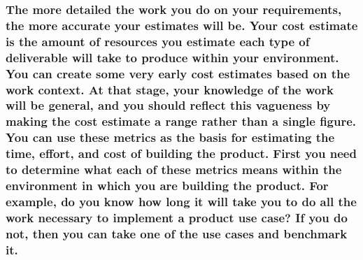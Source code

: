 \documentclass[
]{article}
\begin{document}
{\subsubsection{\texorpdfstring{The more detailed the work you do on your
requirements, the more accurate your estimates will be. Your cost
estimate is the amount of resources you estimate each type of
deliverable will take to produce within your environment. You can create
some very early cost estimates based on the work context. At that stage,
your knowledge of the work will be general, and you should reflect this
vagueness by making the cost estimate a range rather than a single
figure. You can use these metrics as the basis for estimating the time,
effort, and cost of building the product. First you need to determine
what each of these metrics means within the environment in which you are
building the product. For example, do you know how long it will take you
to do all the work necessary to implement a product use case? If you do
not, then you can take one of the use cases and benchmark it.
}{The more detailed the work you do on your requirements, the more accurate your estimates will be. Your cost estimate is the amount of resources you estimate each type of deliverable will take to produce within your environment. You can create some very early cost estimates based on the work context. At that stage, your knowledge of the work will be general, and you should reflect this vagueness by making the cost estimate a range rather than a single figure. You can use these metrics as the basis for estimating the time, effort, and cost of building the product. First you need to determine what each of these metrics means within the environment in which you are building the product. For example, do you know how long it will take you to do all the work necessary to implement a product use case? If you do not, then you can take one of the use cases and benchmark it. }}\label{the-more-detailed-the-work-you-do-on-your-requirements-the-more-accurate-your-estimates-will-be.-your-cost-estimate-is-the-amount-of-resources-you-estimate-each-type-of-deliverable-will-take-to-produce-within-your-environment.-you-can-create-some-very-early-cost-estimates-based-on-the-work-context.-at-that-stage-your-knowledge-of-the-work-will-be-general-and-you-should-reflect-this-vagueness-by-making-the-cost-estimate-a-range-rather-than-a-single-figure.-you-can-use-these-metrics-as-the-basis-for-estimating-the-time-effort-and-cost-of-building-the-product.-first-you-need-to-determine-what-each-of-these-metrics-means-within-the-environment-in-which-you-are-building-the-product.-for-example-do-you-know-how-long-it-will-take-you-to-do-all-the-work-necessary-to-implement-a-product-use-case-if-you-do-not-then-you-can-take-one-of-the-use-cases-and-benchmark-it.}}
\end{document}

